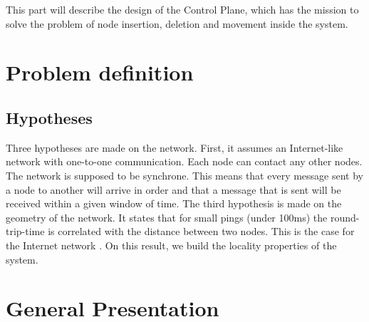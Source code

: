 \documentclass[a4paper,11pt,oneside]{report}
\begin{document}
This part will describe the design of the Control Plane, which has the mission
to solve the problem of node insertion, deletion and movement inside the
system.

\section{Problem definition}

\subsection{Hypotheses}
Three hypotheses are made on the network. First, it assumes an Internet-like
network with one-to-one communication. Each node can contact any other nodes.
The network is supposed to be synchrone. This means that every message sent by
a node to another will arrive in order and that a message that is sent will be
received within a given window of time. The third hypothesis is made on the
geometry of the network. It states that for small pings (under 100ms) the
round-trip-time is correlated with the distance between two nodes. This is the
case for the Internet network \cite{Seibert2014}. On this result, we build the
locality properties of the system. 


\section{General Presentation}
\end{document}
